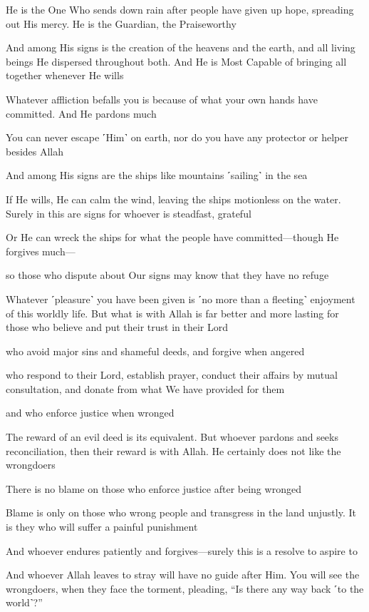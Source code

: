 He is the One Who sends down rain after people have given up hope, spreading out His mercy. He is the Guardian, the Praiseworthy

And among His signs is the creation of the heavens and the earth, and all living beings He dispersed throughout both. And He is Most Capable of bringing all together whenever He wills

Whatever affliction befalls you is because of what your own hands have committed. And He pardons much

You can never escape ˹Him˺ on earth, nor do you have any protector or helper besides Allah

And among His signs are the ships like mountains ˹sailing˺ in the sea

If He wills, He can calm the wind, leaving the ships motionless on the water. Surely in this are signs for whoever is steadfast, grateful

Or He can wreck the ships for what the people have committed—though He forgives much—

so those who dispute about Our signs may know that they have no refuge

Whatever ˹pleasure˺ you have been given is ˹no more than a fleeting˺ enjoyment of this worldly life. But what is with Allah is far better and more lasting for those who believe and put their trust in their Lord

who avoid major sins and shameful deeds, and forgive when angered

who respond to their Lord, establish prayer, conduct their affairs by mutual consultation, and donate from what We have provided for them

and who enforce justice when wronged

The reward of an evil deed is its equivalent. But whoever pardons and seeks reconciliation, then their reward is with Allah. He certainly does not like the wrongdoers

There is no blame on those who enforce justice after being wronged

Blame is only on those who wrong people and transgress in the land unjustly. It is they who will suffer a painful punishment

And whoever endures patiently and forgives—surely this is a resolve to aspire to

And whoever Allah leaves to stray will have no guide after Him. You will see the wrongdoers, when they face the torment, pleading, “Is there any way back ˹to the world˺?”

